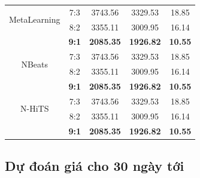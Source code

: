 \begin{table}[H]
\begin{tabular}{|c|c|c|c|c|}
         \hline
         \multirow{2}{*}{MetaLearning} & 7:3 & 3743.56&3329.53&18.85\\ & 8:2 & 3355.11&3009.95&16.14 \\ & \textbf{9:1} & \textbf{2085.35} & \textbf{1926.82} & \textbf{10.55}\\
         \hline
         \multirow{2}{*}{NBeats} & 7:3 & 3743.56&3329.53&18.85\\ & 8:2 & 3355.11&3009.95&16.14 \\ & \textbf{9:1} & \textbf{2085.35} & \textbf{1926.82} & \textbf{10.55}\\
         \hline
         \multirow{2}{*}{N-HiTS} & 7:3 & 3743.56&3329.53&18.85\\ & 8:2 & 3355.11&3009.95&16.14 \\ & \textbf{9:1} & \textbf{2085.35} & \textbf{1926.82} & \textbf{10.55}\\
         \hline
    \end{tabular}
    \label{eibresult}
\end{table}


\subsection{Dự đoán giá cho 30 ngày tới} 

